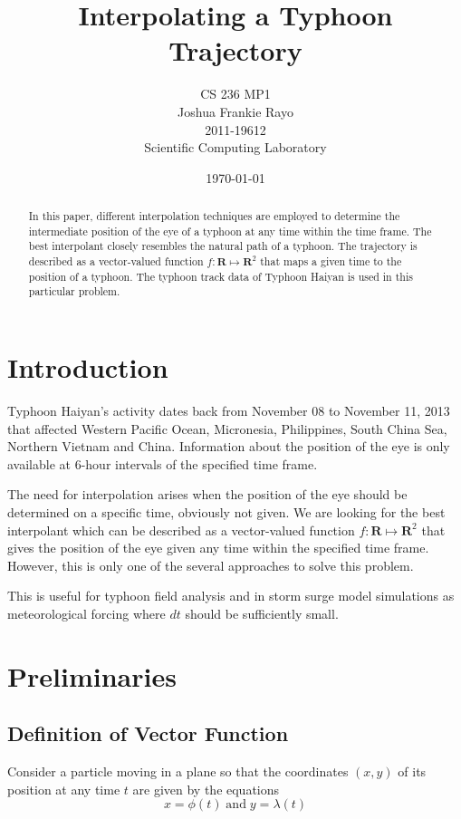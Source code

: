 \documentclass[a4paper, 11pt]{article}
\title{Interpolating a Typhoon Trajectory\\ }
\author{CS 236 MP1\\ Joshua Frankie Rayo\\ 2011-19612\\ Scientific Computing Laboratory}
\date{\today}
\begin{document}
\maketitle

\begin{abstract}
	In this paper, different interpolation techniques are employed to determine the intermediate position of the eye of a typhoon at any time within the time frame. The best interpolant closely resembles the natural path of a typhoon. The trajectory is described as a vector-valued function $f : \mathbf{R} \mapsto \mathbf{R}^2$ that maps a given time to the position of a typhoon. The typhoon track data of Typhoon Haiyan is used in this particular problem.
\end{abstract}

\tableofcontents
\listoffigures
\listoftables

\section{Introduction}
Typhoon Haiyan's activity dates back from November 08 to November 11, 2013 that affected Western Pacific Ocean, Micronesia, Philippines, South China Sea, Northern Vietnam and China. Information about the position of the eye is only available at 6-hour intervals of the specified time frame.

The need for interpolation arises when the position of the eye should be determined on a specific time, obviously not given. We are looking for the best interpolant which can be described as a vector-valued function $f : \mathbf{R} \mapsto \mathbf{R}^2$ that gives the position of the eye given any time within the specified time frame. However, this is only one of the several approaches to solve this problem.

This is useful for typhoon field analysis and in storm surge model simulations as meteorological forcing where $dt$ should be sufficiently small.

\section{Preliminaries}
\subsection{Definition of Vector Function}
Consider a particle moving in a plane so that the coordinates $(x, y)$ of its position at any time $t$ are given by the equations
$$ x = \phi(t) \; \mathrm{and} \; y = \lambda(t)$$
\end{document}
